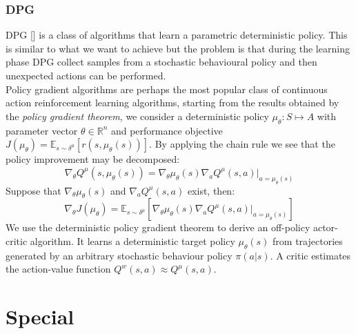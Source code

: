 \subsubsection{DPG} \label{subsec:dpg}
\acf{DPG} [\citet{article}] is a class of algorithms that learn a parametric deterministic policy. This is similar to what we want to achieve but the problem is that during the learning phase \ac{DPG} collect samples from a stochastic behavioural policy and then unexpected actions can be performed.\\
\newline
Policy gradient algorithms are perhaps the most popular class of continuous action reinforcement learning algorithms, starting from the results obtained by the \emph{policy gradient theorem}, we consider a deterministic policy $\mu_{\theta}: S \mapsto A$ with parameter vector $\theta \in \mathbb{R}^n$ and performance objective $J(\mu_{\theta}) = \mathbb{E}_{s \sim \delta^{\mu}}[r(s, \mu_{\theta}(s))]$. 
By applying the chain rule we see that the policy improvement may be decomposed:
$$
\nabla_{\theta} Q^{\mu}(s, \mu_{\theta}(s)) = \nabla_{\theta}\mu_{\theta}(s)\nabla_a Q^{\mu}(s, a)|_{a=\mu_{\theta}(s)}
$$
Suppose that $\nabla_{\theta}\mu_{\theta}(s)$ and $\nabla_aQ^{\mu}(s,a)$ exist, then:
$$
\nabla_{\theta}J(\mu_{\theta}) = \mathbb{E}_{s \sim \delta^{\mu}} [\nabla_{\theta} \mu_{\theta} (s) \nabla_a Q^{\mu}(s,a)|_{a = \mu_{\theta} (s)}]
$$
We use the deterministic policy gradient theorem to derive an off-policy actor-critic algorithm. It learns a deterministic target policy $\mu_{\theta}(s)$ from trajectories generated by an arbitrary stochastic behaviour policy $\pi(a|s)$. A critic estimates the action-value function $Q^w(s,a) \approx Q^{\mu}(s,a)$. 

\section{Special } \label{sec:specmdp}

